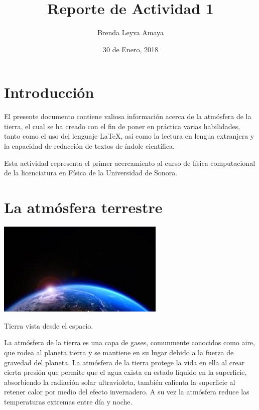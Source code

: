 \documentclass{article} %
\title{Reporte de Actividad 1}
\author{Brenda Leyva Amaya}
\date{30 de Enero, 2018}
\begin{document}
\maketitle %


\section{Introducción}

	El presente documento contiene valiosa información acerca de la atmósfera de la tierra, el cual se ha creado con el fin de poner en práctica varias habilidades, tanto como el uso del lenguaje \LaTeX, así como la lectura en lengua extranjera y la capacidad de redacción de textos de índole científica.
\vspace{0.5 cm}

    Esta actividad representa el primer acercamiento al curso de física computacional de la licenciatura en Física de la Universidad de Sonora. 

\section{La atmósfera terrestre}

 \begin{center}
 	\includegraphics[width=8cm]{index.jpeg}
    
    Tierra vista desde el espacio.
 \end{center}

	La atmósfera de la tierra es una capa de gases, comunmente conocidos como aire, que rodea al planeta tierra y se mantiene en su lugar debido a la fuerza de gravedad del planeta. La atmósfera de la tierra protege la vida en ella al crear cierta presión que permite que el agua exista en estado líquido en la superficie, absorbiendo la radiación solar ultravioleta, también calienta la superficie al retener calor por medio del efecto invernadero. A su vez la atmósfera reduce las temperaturas extremas entre día y noche. 
\vspace{0.5 cm}
\end{document}
